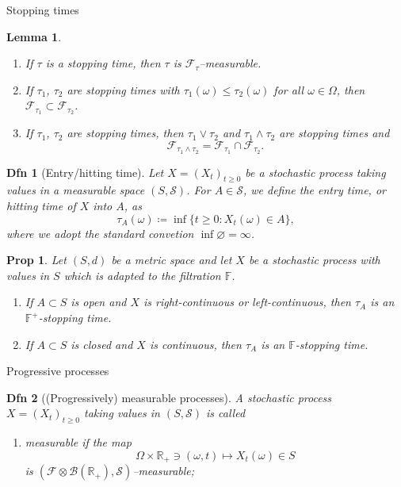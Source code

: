 \documentclass[a4paper]{article}
\theoremstyle{mytheoremstyle}
\newtheorem{definition}{Dfn}
\newtheorem{lemma}{Lemma}
\newtheorem{proposition}{Prop}
\newcommand{\1}{\mathds{1}}
\begin{document}
\begin{multicols*}{3}
\begin{roundbox}{Stopping times}
\begin{lemma}
\begin{enumerate}[parsep=0.2pt]
    \item If $\tau$ is a stopping time, then $\tau$ is
    $\mathcal{F}_{\tau}$--measurable.
    
    \item If $\tau_1$, $\tau_2$ are stopping times with $\tau_1 (\omega)
    \leqslant \tau_2 (\omega)$ for all $\omega \in \Omega$, then
    $\mathcal{F}_{\tau_1} \subset \mathcal{F}_{\tau_2}$.
    
    \item If $\tau_1$, $\tau_2$ are stopping times, then $\tau_1 \vee \tau_2$
    and $\tau_1 \wedge \tau_2$ are stopping times and
    \[ \mathcal{F}_{\tau_1 \wedge \tau_2} =\mathcal{F}_{\tau_1} \cap
       \mathcal{F}_{\tau_2} . \]
  \end{enumerate}
\end{lemma}

\begin{definition}[Entry/hitting time]
  Let $X = (X_t)_{t \geqslant 0}$ be a stochastic process taking values in a
  measurable space $(S, \mathcal{S})$. For $A \in \mathcal{S}$, we define the
  {\emph{entry time}}, or {\emph{hitting time}} of $X$ into $A$, as
  \[ \tau_A (\omega) \coloneq \inf \{t \geqslant 0 : X_t (\omega) \in A\}, \]
  where we adopt the standard convetion $\inf \varnothing = \infty$.
\end{definition}

\begin{proposition}
  \label{prop:simple stopping times}Let $(S, d)$ be a metric space and let $X$
  be a stochastic process with values in $S$ which is adapted to the
  filtration $\mathbb{F}$.
  \begin{enumerate}
    \item If $A \subset S$ is open and $X$ is right-continuous or
    left-continuous, then $\tau_A$ is an $\mathbb{F}^+$\mbox{-}stopping time.
    
    \item If $A \subset S$ is closed and $X$ is continuous, then $\tau_A$ is
    an $\mathbb{F}$-stopping time.
  \end{enumerate}
\end{proposition}
\end{roundbox}

\begin{roundbox}{Progressive processes}
\begin{definition}[(Progressively) measurable processes]
  \label{defn:progressively.measurable}A stochastic process $X = (X_t)_{t
  \geqslant 0}$ taking values in $(S, \mathcal{S})$ is called
  \begin{enumerate}[parsep=0.2pt]
    \item {\emph{measurable}} if the map
    \[ \Omega \times \mathbb{R}_+ \ni (\omega, t) \mapsto X_t (\omega) \in S
    \]
    is $(\mathcal{F} \otimes \mathcal{B}(\mathbb{R}_+),
    \mathcal{S})$--measurable;
    

\end{enumerate}
\end{definition}
\end{roundbox}
\end{multicols*}
\end{document}
